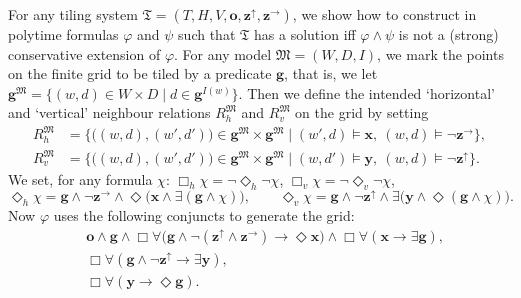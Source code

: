 \documentclass[10pt,a4paper]{amsart}
\theoremstyle{plain}
\theoremstyle{definition}
\newcommand{\tiling}{\mathfrak T}
\newcommand{\bbvarup}{\Zvar^\uparrow}
\newcommand{\bbvarright}{\Zvar^\to}
\newcommand{\Dht}[1]{\Diamond_h{#1}}
\newcommand{\Dvt}[1]{\Diamond_v{#1}}
\newcommand{\Bht}[1]{\Box_h{#1}}
\newcommand{\Bvt}[1]{\Box_v{#1}}
\newcommand{\fform}[1]{\boldsymbol{#1}}
\newcommand{\gvar}{\fform{g}}
\newcommand{\tvar}{\fform{t}}
\newcommand{\xvar}{\fform{x}}
\newcommand{\yvar}{\fform{y}}
\newcommand{\ovar}{\fform{o}}
\newcommand{\Zvar}{\fform{z}}
\newcommand{\Bv}{\forall}
\newcommand{\Bh}{\Box}
\newcommand{\Dv}{\exists}
\newcommand{\Dh}{\Diamond}
\begin{document}
For any tiling system $\tiling=(T,H,V,\ovar,\bbvarup,\bbvarright)$,
we show how to construct in polytime formulas $\varphi$ and $\psi$
such that $\tiling$ has a solution iff $\varphi \wedge \psi$ is not a (strong) conservative extension of $\varphi$. 
%
For any model $\mathfrak{M}=(W,D,I)$, we mark the points on the finite grid to be tiled by a predicate $\gvar$, that is,
we let
%
$
\gvar^{\mathfrak M}=\{(w,d)\in W\times D\mid d\in\gvar^{I(w)}\}.
$
%
Then we define 
%
the intended `horizontal' and `vertical' neighbour relations $R_{h}^{\mathfrak{M}}$ and $R_{v}^{\mathfrak{M}}$ on the grid by setting
%
\begin{align}\label{hrel}
	R_{h}^{\mathfrak{M}} & = \bigl\{\bigl((w,d),(w',d')\bigr) \in \gvar^{\mathfrak{M}}\times \gvar^{\mathfrak{M}} \mid  (w',d) \models \xvar,\ (w,d)\models \neg \bbvarright \bigr\}, \\
	\label{vrel}	
	R_{v}^{\mathfrak{M}} & = \bigl\{\bigl((w,d),(w',d')\bigr) \in \gvar^{\mathfrak{M}}\times \gvar^{\mathfrak{M}} \mid  (w,d') \models \yvar,\ (w,d)\models \neg \bbvarup\bigr\}.
\end{align}
%
We set, for any formula $\chi$: $\Bht{\chi} = \neg \Dht{\neg \chi}$, $\Bvt{\chi}=\neg \Dvt{\neg \chi}$, 
%
\[
\Dht{\chi} = \gvar \land \neg \bbvarright \land \Dh\bigl(\xvar \wedge \Dv (\gvar \wedge \chi)\bigr),\qquad
\Dvt{\chi}  = \gvar \land \neg \bbvarup\land \Dv\bigl(\yvar \wedge \Dh (\gvar \wedge \chi)\bigr).
\]
%
%
Now $\varphi$ uses the following conjuncts to generate the grid: 
%
\begin{align}
	\nonumber
	& \ovar \land \gvar
	 \land \Bh\Bv \bigl(\gvar \wedge \neg (\bbvarup \wedge \bbvarright) \rightarrow \Dh \xvar\bigr)
	 \land \Bh\Bv (\xvar \rightarrow \Dv \gvar),\\
 		\label{hedge1}	
	& \Bh\Bv (\gvar \wedge \neg \bbvarup \rightarrow \Dv \yvar),\\
	\label{hedge2}		
	& \Bh\Bv (\yvar \rightarrow \Dh \gvar).
\end{align}
\end{document}
